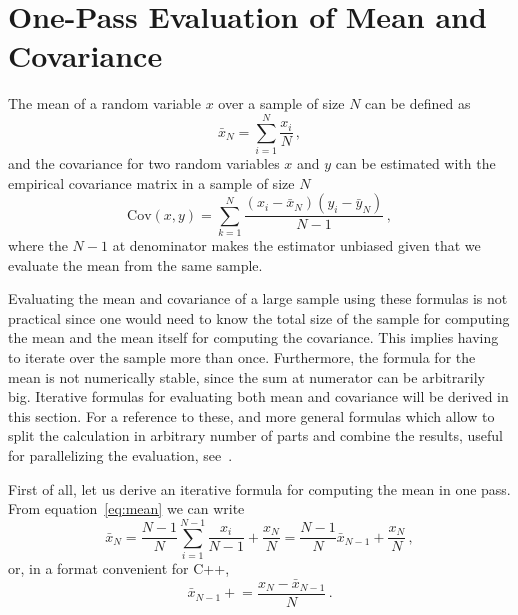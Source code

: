 \documentclass[10pt,a4paper]{report}
\begin{document}
\newpage
\appendix
\section{One-Pass Evaluation of Mean and Covariance}

The mean of a random variable $x$ over a sample of size $N$ can be defined as
\begin{equation}
\bar{x}_N = \sum\limits_{i=1}^N\frac{x_i}{N}\, ,
\label{eq:mean}
\end{equation}
and the covariance for two random variables $x$ and $y$ can be estimated with the empirical covariance matrix in a sample of size $N$
\begin{equation}
\mbox{Cov}(x,y) = \sum\limits_{k=1}^N \frac{(x_i - \bar{x}_N)(y_i - \bar{y}_N)}{N-1}\, ,
\label{eq:covariance}
\end{equation}
where the $N-1$ at denominator makes the estimator unbiased given that we evaluate the mean from the same sample.

Evaluating the mean and covariance of a large sample using these formulas is not practical since one would need to know the total size of the sample for computing the mean and the mean itself for computing the covariance. This implies having to iterate over the sample more than once. Furthermore, the formula for the mean is not numerically stable, since the sum at numerator can be arbitrarily big. Iterative formulas for evaluating both mean and covariance will be derived in this section. For a reference to these, and more general formulas which allow to split the calculation in arbitrary number of parts and combine the results, useful for parallelizing the evaluation, see~\cite{IterativeMeanAndCovariance}.

First of all, let us derive an iterative formula for computing the mean in one pass. From equation~\ref{eq:mean} we can write
\begin{equation}
\bar{x}_N = \frac{N-1}{N}\sum\limits_{i=1}^{N-1}\frac{x_i}{N-1} + \frac{x_N}{N} = \frac{N-1}{N}\bar{x}_{N-1} + \frac{x_N}{N}\, ,
\label{eq:iterativeMean}
\end{equation}
or, in a format convenient for C++,
\begin{equation}
\bar{x}_{N-1} \mathrel{+}= \frac{x_N - \bar{x}_{N-1}}{N} \, .
\end{equation}
\end{document}
